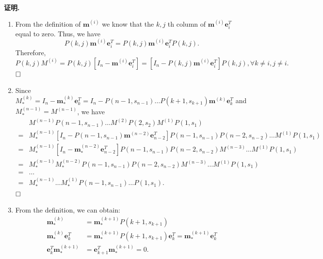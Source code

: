 \documentclass[11pt]{article}
\begin{document}
\textbf{证明.}
\begin{enumerate}
    \item From the definition of $\boldsymbol{m}^{(i)}$ we know that the $k,j$ th column of $\boldsymbol{m}^{(i)} \boldsymbol{e}_{i}^{T}$ equal to zero. Thus, we have
    $$P(k, j) \boldsymbol{m}^{(i)} \boldsymbol{e}_{i}^{T}=P(k, j)\boldsymbol{m}^{(i)} \boldsymbol{e}_{i}^{T} P(k, j).$$Therefore,
    $$P(k, j) M^{(i)}=P(k, j)\left[I_n- \boldsymbol{m}^{(i)} \boldsymbol{e}_{i}^{T} \right]=\left[I_{n}-P(k, j) \boldsymbol{m}^{(i)} \boldsymbol{e}_{i}^{T}\right] P(k, j), \forall k\neq i,j \neq i.$$$\hfill\square$
    \item Since $M_{*}^{(k)}=I_{n}-\boldsymbol{m}_{*}^{(k)} \boldsymbol{e}_{k}^{T}=I_{n}-P\left(n-1, s_{n-1}\right) \ldots P\left(k+1, s_{k+1}\right) \boldsymbol{m}^{(k)} \boldsymbol{e}_{k}^{T}$ and $M_{*}^{(n-1)}=M^{(n-1)}$, we have 
    \begin{align*}
    & M^{(n-1)} P\left(n-1, s_{n-1}\right) \ldots M^{(2)} P\left(2, s_{2}\right) M^{(1)} P\left(1, s_{1}\right) \\
    =&M_{*}^{(n-1)} \left[ I_{n}-P\left(n-1, s_{n-1}\right)\boldsymbol{m}^{(n-2)} \boldsymbol{e}_{n-2}^{T} \right] P\left(n-1, s_{n-1}\right) P\left(n-2, s_{n-2}\right) \ldots M^{(1)} P\left(1, s_{1}\right) \\
    =&M_{*}^{(n-1)} \left[ I_{n}-\boldsymbol{m}_*^{(n-2)} \boldsymbol{e}_{n-2}^{T} \right] P\left(n-1, s_{n-1}\right) P\left(n-2, s_{n-2}\right) M^{(n-3)}\ldots M^{(1)} P\left(1, s_{1}\right)\\ 
    =&M_{*}^{(n-1)} M_{*}^{(n-2)} P\left(n-1, s_{n-1}\right) P\left(n-2, s_{n-2}\right) M^{(n-3)}\ldots M^{(1)} P\left(1, s_{1}\right)\\ 
    =&\ldots\\
    =& M_{*}^{(n-1)} \ldots M_{*}^{(1)} P\left(n-1, s_{n-1}\right) \ldots P\left(1, s_{1}\right).
    \end{align*}
    $\hfill\square$
    \item From the definition, we can obtain:
    \begin{align*}
        \boldsymbol{m}_*^{(k)}&=\boldsymbol{m}_*^{(k+1)} P(k+1,s_{k+1})\\ 
        \boldsymbol{m}_*^{(k)}\boldsymbol{e}_{k}^{T}&=\boldsymbol{m}_*^{(k+1)} P(k+1,s_{k+1})\boldsymbol{e}_{k}^{T}=\boldsymbol{m}_*^{(k+1)}\boldsymbol{e}_{k}^{T}\\ 
        \boldsymbol{e}_{k}^{T}\boldsymbol{m}_*^{(k+1)}& = \boldsymbol{e}_{k+1}^{T}\boldsymbol{m}_*^{(k+1)}=0.
    \end{align*}

\end{enumerate}
\end{document}
